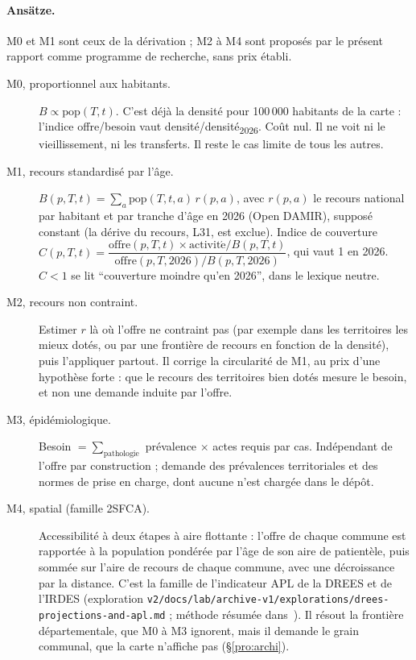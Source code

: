 \paragraph{Ansätze.}
M0 et M1 sont ceux de la dérivation ; M2 à M4 sont proposés par le présent rapport comme programme de recherche, sans prix établi.
\begin{description}
\item[M0, proportionnel aux habitants.] $B\propto\mathrm{pop}(T,t)$. C'est déjà la densité pour 100\,000\mesure{} habitants de la carte : l'indice offre/besoin vaut densité/densité\textsubscript{2026}. Coût nul. Il ne voit ni le vieillissement, ni les transferts. Il reste le cas limite de tous les autres.
\item[M1, recours standardisé par l'âge.] $B(p,T,t)=\sum_{a}\mathrm{pop}(T,t,a)\,r(p,a)$, avec $r(p,a)$ le recours national par habitant et par tranche d'âge en 2026 (Open DAMIR), supposé constant (la dérive du recours, L31, est exclue). Indice de couverture
$C(p,T,t)=\dfrac{\mathrm{offre}(p,T,t)\times\mathrm{activit\acute{e}}/B(p,T,t)}{\mathrm{offre}(p,T,2026)/B(p,T,2026)}$, qui vaut 1\derive{} en 2026. $C<1$ se lit \enquote{couverture moindre qu'en 2026}, dans le lexique neutre.
\item[M2, recours non contraint.] Estimer $r$ là où l'offre ne contraint pas (par exemple dans les territoires les mieux dotés, ou par une frontière de recours en fonction de la densité), puis l'appliquer partout. Il corrige la circularité de M1, au prix d'une hypothèse forte : que le recours des territoires bien dotés mesure le besoin, et non une demande induite par l'offre.
\item[M3, épidémiologique.] Besoin $=\sum_{\text{pathologie}}$ prévalence $\times$ actes requis par cas. Indépendant de l'offre par construction ; demande des prévalences territoriales et des normes de prise en charge, dont aucune n'est chargée dans le dépôt.
\item[M4, spatial (famille 2SFCA).] Accessibilité à deux étapes à aire flottante : l'offre de chaque commune est rapportée à la population pondérée par l'âge de son aire de patientèle, puis sommée sur l'aire de recours de chaque commune, avec une décroissance par la distance. C'est la famille de l'indicateur APL de la DREES et de l'IRDES (exploration \texttt{v2/\allowbreak{}docs/\allowbreak{}lab/\allowbreak{}archive-\allowbreak{}v1/\allowbreak{}explorations/\allowbreak{}drees-\allowbreak{}projections-\allowbreak{}and-\allowbreak{}apl.md} ; méthode résumée dans~\citep{e-bahroun2025}). Il résout la frontière départementale, que M0 à M3 ignorent, mais il demande le grain communal, que la carte n'affiche pas (§\ref{pro:archi}).
\end{description}

